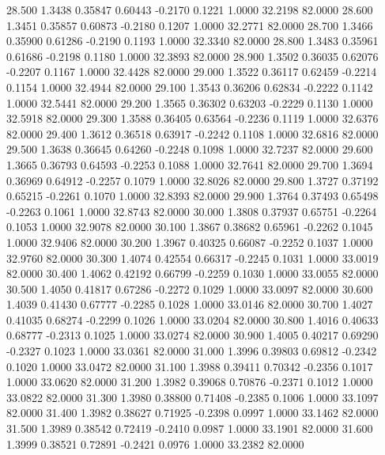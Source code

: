  28.500   1.3438   0.35847   0.60443  -0.2170   0.1221   1.0000  32.2198  82.0000
  28.600   1.3451   0.35857   0.60873  -0.2180   0.1207   1.0000  32.2771  82.0000
  28.700   1.3466   0.35900   0.61286  -0.2190   0.1193   1.0000  32.3340  82.0000
  28.800   1.3483   0.35961   0.61686  -0.2198   0.1180   1.0000  32.3893  82.0000
  28.900   1.3502   0.36035   0.62076  -0.2207   0.1167   1.0000  32.4428  82.0000
  29.000   1.3522   0.36117   0.62459  -0.2214   0.1154   1.0000  32.4944  82.0000
  29.100   1.3543   0.36206   0.62834  -0.2222   0.1142   1.0000  32.5441  82.0000
  29.200   1.3565   0.36302   0.63203  -0.2229   0.1130   1.0000  32.5918  82.0000
  29.300   1.3588   0.36405   0.63564  -0.2236   0.1119   1.0000  32.6376  82.0000
  29.400   1.3612   0.36518   0.63917  -0.2242   0.1108   1.0000  32.6816  82.0000
  29.500   1.3638   0.36645   0.64260  -0.2248   0.1098   1.0000  32.7237  82.0000
  29.600   1.3665   0.36793   0.64593  -0.2253   0.1088   1.0000  32.7641  82.0000
  29.700   1.3694   0.36969   0.64912  -0.2257   0.1079   1.0000  32.8026  82.0000
  29.800   1.3727   0.37192   0.65215  -0.2261   0.1070   1.0000  32.8393  82.0000
  29.900   1.3764   0.37493   0.65498  -0.2263   0.1061   1.0000  32.8743  82.0000
  30.000   1.3808   0.37937   0.65751  -0.2264   0.1053   1.0000  32.9078  82.0000
  30.100   1.3867   0.38682   0.65961  -0.2262   0.1045   1.0000  32.9406  82.0000
  30.200   1.3967   0.40325   0.66087  -0.2252   0.1037   1.0000  32.9760  82.0000
  30.300   1.4074   0.42554   0.66317  -0.2245   0.1031   1.0000  33.0019  82.0000
  30.400   1.4062   0.42192   0.66799  -0.2259   0.1030   1.0000  33.0055  82.0000
  30.500   1.4050   0.41817   0.67286  -0.2272   0.1029   1.0000  33.0097  82.0000
  30.600   1.4039   0.41430   0.67777  -0.2285   0.1028   1.0000  33.0146  82.0000
  30.700   1.4027   0.41035   0.68274  -0.2299   0.1026   1.0000  33.0204  82.0000
  30.800   1.4016   0.40633   0.68777  -0.2313   0.1025   1.0000  33.0274  82.0000
  30.900   1.4005   0.40217   0.69290  -0.2327   0.1023   1.0000  33.0361  82.0000
  31.000   1.3996   0.39803   0.69812  -0.2342   0.1020   1.0000  33.0472  82.0000
  31.100   1.3988   0.39411   0.70342  -0.2356   0.1017   1.0000  33.0620  82.0000
  31.200   1.3982   0.39068   0.70876  -0.2371   0.1012   1.0000  33.0822  82.0000
  31.300   1.3980   0.38800   0.71408  -0.2385   0.1006   1.0000  33.1097  82.0000
  31.400   1.3982   0.38627   0.71925  -0.2398   0.0997   1.0000  33.1462  82.0000
  31.500   1.3989   0.38542   0.72419  -0.2410   0.0987   1.0000  33.1901  82.0000
  31.600   1.3999   0.38521   0.72891  -0.2421   0.0976   1.0000  33.2382  82.0000
